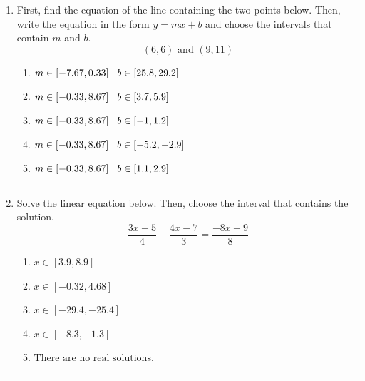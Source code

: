 \documentclass[14pt]{extbook}
\newcommand{\litem}[1]{\item#1\hspace*{-1cm}\rule{\textwidth}{0.4pt}}
\begin{document}
\begin{enumerate}
\litem{
First, find the equation of the line containing the two points below. Then, write the equation in the form $ y=mx+b $ and choose the intervals that contain $m$ and $b$.\[ (6, 6) \text{ and } (9, 11) \]\begin{enumerate}[label=\Alph*.]
\item \( m \in [-7.67, 0.33] \hspace*{3mm} b \in [25.8, 29.2] \)
\item \( m \in [-0.33, 8.67] \hspace*{3mm} b \in [3.7, 5.9] \)
\item \( m \in [-0.33, 8.67] \hspace*{3mm} b \in [-1, 1.2] \)
\item \( m \in [-0.33, 8.67] \hspace*{3mm} b \in [-5.2, -2.9] \)
\item \( m \in [-0.33, 8.67] \hspace*{3mm} b \in [1.1, 2.9] \)

\end{enumerate} }
\litem{
Solve the linear equation below. Then, choose the interval that contains the solution.\[ \frac{3x -5}{4} - \frac{4x -7}{3} = \frac{-8x -9}{8} \]\begin{enumerate}[label=\Alph*.]
\item \( x \in [3.9, 8.9] \)
\item \( x \in [-0.32, 4.68] \)
\item \( x \in [-29.4, -25.4] \)
\item \( x \in [-8.3, -1.3] \)
\item \( \text{There are no real solutions.} \)


\end{enumerate}}
\end{enumerate}
\end{document}
